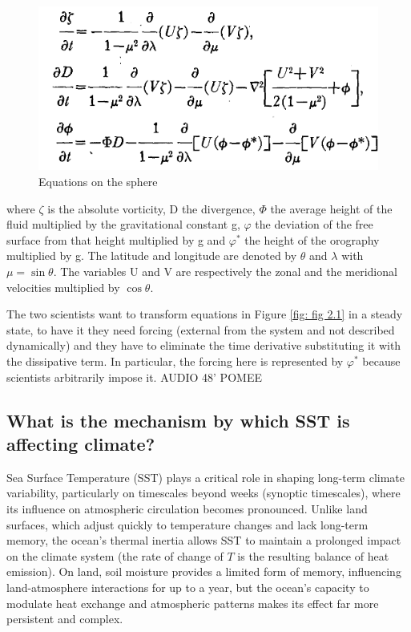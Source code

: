 \begin{figure}[htp!]
	\centering
	\includegraphics[width=0.5\linewidth]{uploads/19image.png}
	\caption{Equations on the sphere}
	\label{fig: fig 2.2}

\end{figure}
where $\zeta$ is the absolute vorticity, D the divergence, $\Phi$
the average height of the fluid multiplied by the gravitational constant g, $\varphi$ the deviation of the free surface from that height multiplied by g and $\varphi^*$ the height of the orography multiplied by g. The latitude and longitude are denoted by $\theta$ and $\lambda$ with $\mu = \sin \theta$. The variables U and V are respectively the zonal and the meridional velocities multiplied by $\cos \theta$.


The two scientists want to transform equations in Figure \ref{fig: fig 2.1} in a steady state, to have it they need forcing (external from the system and not described dynamically) and they have to eliminate the time derivative substituting it with the dissipative term.
In particular, the forcing here is represented by $\varphi^*$ because scientists arbitrarily impose it.
AUDIO 48' POMEE




\subsection{What is the mechanism by which SST is affecting climate?}

Sea Surface Temperature (SST) plays a critical role in shaping long-term climate variability, particularly on timescales beyond weeks (synoptic timescales), where its influence on atmospheric circulation becomes pronounced. Unlike land surfaces, which adjust quickly to temperature changes and lack long-term memory, the ocean's thermal inertia allows SST to maintain a prolonged impact on the climate system (the rate of change of $T$ is the resulting balance of heat emission). On land, soil moisture provides a limited form of memory, influencing land-atmosphere interactions for up to a year, but the ocean’s capacity to modulate heat exchange and atmospheric patterns makes its effect far more persistent and complex.

